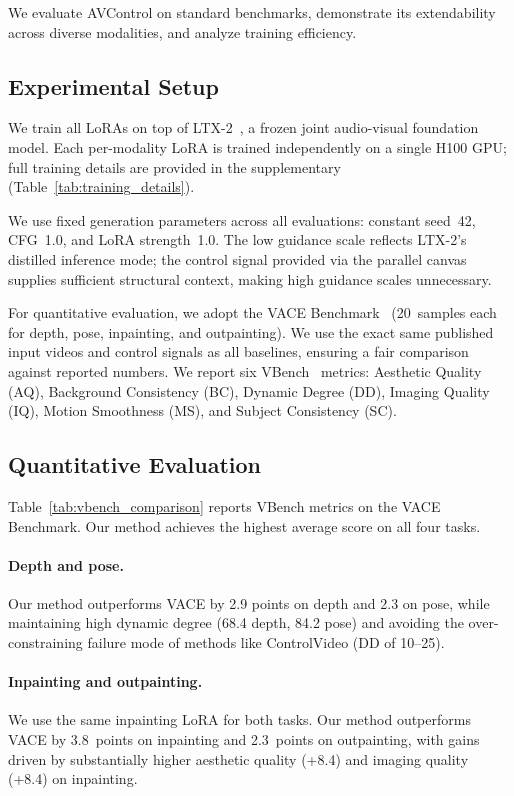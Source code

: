 We evaluate AVControl on standard benchmarks, demonstrate its extendability across diverse modalities, and analyze training efficiency.

\subsection{Experimental Setup}
\label{sec:setup}
We train all LoRAs on top of LTX-2~\cite{hacohen2026ltx2}, a frozen joint audio-visual foundation model. Each per-modality LoRA is trained independently on a single H100 GPU; full training details are provided in the supplementary (Table~\ref{tab:training_details}).

We use fixed generation parameters across all evaluations: constant seed~42, CFG~1.0, and LoRA strength~1.0. The low guidance scale reflects LTX-2's distilled inference mode; the control signal provided via the parallel canvas supplies sufficient structural context, making high guidance scales unnecessary.

For quantitative evaluation, we adopt the VACE Benchmark~\cite{jiang2025vace} (20~samples each for depth, pose, inpainting, and outpainting). We use the exact same published input videos and control signals as all baselines, ensuring a fair comparison against reported numbers. We report six VBench~\cite{huang2024vbench} metrics: Aesthetic Quality (AQ), Background Consistency (BC), Dynamic Degree (DD), Imaging Quality (IQ), Motion Smoothness (MS), and Subject Consistency (SC).

\subsection{Quantitative Evaluation}
\label{sec:quant}



Table~\ref{tab:vbench_comparison} reports VBench metrics on the VACE Benchmark. Our method achieves the highest average score on all four tasks.

\paragraph{Depth and pose.} Our method outperforms VACE by 2.9 points on depth and 2.3 on pose, while maintaining high dynamic degree (68.4 depth, 84.2 pose) and avoiding the over-constraining failure mode of methods like ControlVideo (DD of 10--25).

\paragraph{Inpainting and outpainting.} We use the same inpainting LoRA for both tasks. Our method outperforms VACE by 3.8~points on inpainting and 2.3~points on outpainting, with gains driven by substantially higher aesthetic quality (+8.4) and imaging quality (+8.4) on inpainting.

